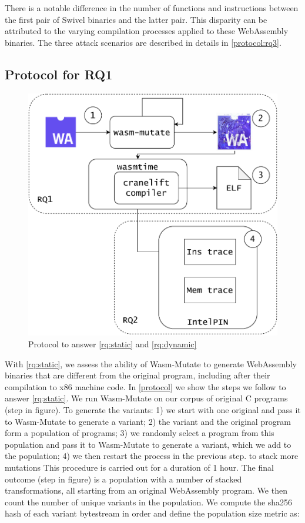 \documentclass[a4paper,fleqn]{cas-dc}
\newcommand{\tool}{{\sc Wasm-Mutate}\xspace}
\newcommand{\Wasm}{WebAssembly\xspace}
\newcommand{\wasm}{\Wasm}
\newcommand*\step[1]{
\noindent\tikz[baseline=(char.base)]{
        \node[shape=circle,text=black,draw=black, fill=white,inner sep=1.2pt] (char) {#1};}}
\begin{document}
There is a notable difference in the number of functions and instructions between the first pair of Swivel binaries and the latter pair. 
This disparity can be attributed to the varying compilation processes applied to these \Wasm binaries. 
The three attack scenarios are described in details in 
\autoref{protocol:rq3}.


\subsection{Protocol for RQ1}
\label{protocol:rq1}

\begin{figure}
    \centering
    \includegraphics[width=0.8\linewidth]{figures/protocol.pdf}
    \caption{Protocol to answer \ref{rq:static} and \ref{rq:dynamic}}
  \label{protocol}
\end{figure}


With \ref{rq:static},
we assess the ability of \tool to generate \Wasm binaries that are different from the original program, including after their compilation to x86 machine code.
In \autoref{protocol} we show the steps we follow to answer \ref{rq:static}.
We run \tool on our corpus of \nProgramsRosetta{} original C programs (step \step{1} in figure). 
To generate the variants:
1) we start with one original and pass it to \tool to generate a variant;  
2) the variant and the original program form a population of programs; 
3) we randomly select a program from this population and pass it to \tool to generate a variant, which we add to the population; 
4) we then restart the process in the previous step. to stack more mutations 
This procedure is carried out for a duration of 1 hour.
The final outcome (step \step{2} in figure) is a population with a number of stacked transformations, all starting from an original \wasm program.
We then count the number of unique variants in the population.
We compute the sha256 hash of each variant bytestream in order and define the population size metric as: 
\end{document}
